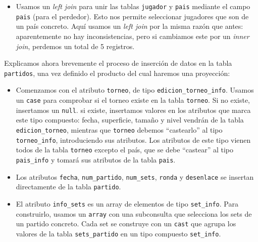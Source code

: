 \begin{itemize}
\item Usamos un \textit{left join} para unir las tablas \texttt{jugador} y \texttt{pais} mediante el campo \texttt{pais} (para el perdedor). Esto nos permite seleccionar jugadores que son de un país concreto. Aquí usamos un \textit{left join} por la misma razón que antes: aparentemente no hay inconsistencias, pero si cambiamos este por un \textit{inner join}, perdemos un total de 5 registros. 
\end{itemize}

Explicamos ahora brevemente el proceso de inserción de datos en la tabla \texttt{partidos}, una vez definido el producto del cual haremos una proyección:
\begin{itemize}
\item Comenzamos con el atributo \texttt{torneo}, de tipo \texttt{edicion\_torneo\_info}. Usamos un \texttt{case} para comprobar si el torneo existe en la tabla \texttt{torneo}. Si no existe, insertamos un \texttt{null}. si existe, insertamos valores en los atributos que marca este tipo compuesto: fecha, superficie, tamaño y nivel vendrán de la tabla \texttt{edicion\_torneo}, mientras que \texttt{torneo} debemos ``castearlo'' al tipo \texttt{torneo\_info}, introduciendo sus atributos. Los atributos de este tipo vienen todos de la tabla \texttt{torneo} excepto el país, que se debe ``castear'' al tipo \texttt{pais\_info} y tomará sus atributos de la tabla \texttt{pais}.
\item Los atributos \texttt{fecha}, \texttt{num\_partido}, \texttt{num\_sets}, \texttt{ronda} y \texttt{desenlace} se insertan directamente de la tabla \texttt{partido}.
\item El atributo \texttt{info\_sets} es un array de elementos de tipo \texttt{set\_info}. Para construirlo, usamos un \texttt{array} con una subconsulta que selecciona los sets de un partido concreto. Cada set se construye con un \texttt{cast} que agrupa los valores de la tabla \texttt{sets\_partido} en un tipo compuesto \texttt{set\_info}. \\


\end{itemize}

